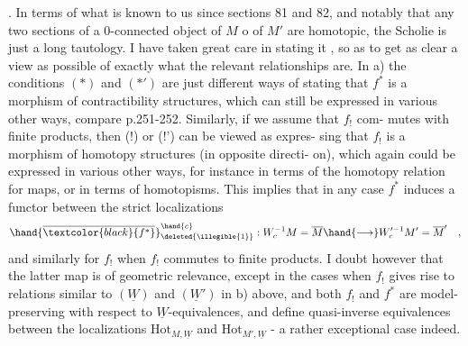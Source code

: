 
\hand{\uline{\textcolor{black}{Comments}}}. In terms of what is known to us since sections 81 and 82,
and notably that any two sections of a 0-connected object of $M$ o of $M'$
are homotopic, the Scholie is just a long tautology. I have taken
great care  in stating it , so as to get as clear a view as possible of
exactly what the relevant relationships are. In a) the conditions
$(*)$ and $(*')$ are just different ways of stating that $f^*$ is a morphism
of contractibility structures, which can still be expressed in various
other ways, compare p.251-252. Similarly, if we assume that $f_!$ com-%
mutes with finite products, then (!) or (!') can be viewed as expres-%
sing that $f_!$ is a morphism of homotopy structures (in opposite directi-%
on), which again could be expressed in various other ways, for instance
in terms of the homotopy relation for maps, or in terms of homotopisms.
This implies that in any case $f^*$ induces a  functor between
the strict localizations
\[ \hand{\overline{\textcolor{black}{f^*}}}^{\hand{c}}_{\deleted{\illegible{1}}} : W_c^{-1}M = \overline{M} \hand{\longrightarrow} W'^{-1}_cM' = \overline{M}' \quad , \]
and similarly for $f_!$ when $f_!$ commutes to finite products. I doubt
however that the latter  map is of geometric relevance, except  in the
cases when  $f_!$ gives rise to relations similar to $(\underline{W})$ and $(\underline{W}')$ in
b) above, and both $f_!$ and $f^*$ are model-preserving with respect to
$\underline{W}$-equivalences, and define quasi-inverse equivalences between the
localizations $\mathrm{Hot}_{M,\underline{W}}$ and $\mathrm{Hot}_{M',\underline{W}}$ - a rather exceptional case indeed.

